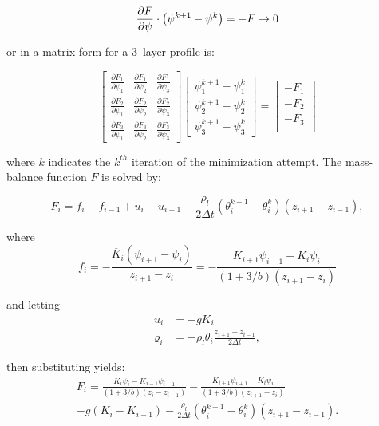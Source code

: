 \documentclass[10pt, letterpapr]{article}
\begin{document}
\[
	\frac{\partial F}{\partial\psi}\cdot \left(\psi^{k+1}-\psi^k\right)=-F\rightarrow 0 \\
\]

\noindent or in a matrix-form for a $3$--layer profile is:

\[
	\begin{bmatrix}
		\frac{\partial F_1}{\partial\psi_1} & \frac{\partial F_1}{\partial\psi_2} & \frac{\partial F_1}{\partial\psi_3} \\
		\frac{\partial F_2}{\partial\psi_1} & \frac{\partial F_2}{\partial\psi_2} & \frac{\partial F_2}{\partial\psi_3} \\
		\frac{\partial F_3}{\partial\psi_1} & \frac{\partial F_3}{\partial\psi_2} & \frac{\partial F_3}{\partial\psi_3}
	\end{bmatrix}
	\begin{bmatrix}
		\psi_1^{k+1}-\psi_1^k \\
		\psi_2^{k+1}-\psi_2^k \\
		\psi_3^{k+1}-\psi_3^k
	\end{bmatrix}
	=
	\begin{bmatrix}
		-F_1 \\
		-F_2 \\
		-F_3 \\
	\end{bmatrix}	
\]

\noindent where $k$ indicates the $k^{th}$ iteration of the minimization attempt. The mass-balance function $F$ is solved by:

\[
	F_i=f_i-f_{i-1}+u_i-u_{i-1}-\frac{\rho_l}{2\Delta t}\left(\theta_i^{k+1}-\theta_i^k\right)\left(z_{i+1}-z_{i-1}\right),
\]

\noindent where
\[
	f_i=-\frac{\overline{K}_i\left(\psi_{i+1}-\psi_i\right)}{z_{i+1}-z_i} = -\frac{K_{i+1}\psi_{i+1}-K_i\psi_i}{\left(1+3/b\right)\left(z_{i+1}-z_i\right)}	
\]

\noindent and letting
\begin{align*}
	u_i &=-gK_i \\
	\varrho_i &=-\rho_l\theta_i\frac{z_{i+1}-z_{i-1}}{2\Delta t},
\end{align*}

\noindent then substituting yields:
\begin{multline*}
	F_i=\frac{K_i\psi_i-K_{i-1}\psi_{i-1}}{\left(1+3/b\right)\left(z_i-z_{i-1}\right)}
	-\frac{K_{i+1}\psi_{i+1}-K_i\psi_i}{\left(1+3/b\right)\left(z_{i+1}-z_i\right)} \\
	-g\left(K_i-K_{i-1}\right)-
	\frac{\rho_l}{2\Delta t}\left(\theta_i^{k+1}-\theta_i^k\right)\left(z_{i+1}-z_{i-1}\right).
\end{multline*}
\end{document}
